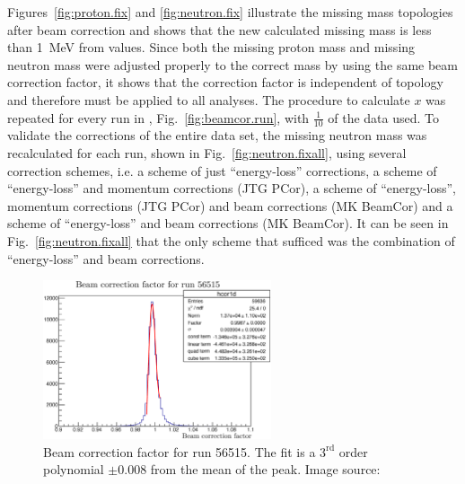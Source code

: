 Figures~\ref{fig:proton.fix} and \ref{fig:neutron.fix} illustrate the missing mass topologies after beam correction and shows that the new calculated missing mass is less than 1~MeV from  values. Since both the missing proton mass and missing neutron mass were adjusted properly to the correct mass by using the same beam correction factor, it shows that the correction factor is independent of topology and therefore must be applied to all  analyses. The procedure to calculate $x$ was repeated for every run in , Fig.~\ref{fig:beamcor.run}, with $\frac{1}{10}$ of the data used. To validate the corrections of the entire  data set, the missing neutron mass was recalculated for each run, shown in  Fig.~\ref{fig:neutron.fixall}, using several correction schemes, i.e. a scheme of just ``energy-loss'' corrections, a scheme of ``energy-loss'' and momentum corrections (JTG PCor), a scheme of ``energy-loss'', momentum corrections (JTG PCor) and beam corrections (MK BeamCor) and a scheme of ``energy-loss'' and beam corrections (MK BeamCor). It can be seen in Fig.~\ref{fig:neutron.fixall} that the only scheme that sufficed was the combination of ``energy-loss'' and beam corrections.


\begin{figure}\begin{center}
\includegraphics[width=0.6\textwidth]{figures/calib/tag/ecor/56515_cor.eps}
\caption[Beam Correction Factor for Run 56515]{\label{fig:56515.cor} Beam correction factor for run 56515. The fit is a $3^\mathrm{rd}$ order polynomial $\pm 0.008$ from the mean of the peak. Image source:~\cite{clas.thesis.kunkel}}
\end{center}\end{figure}

